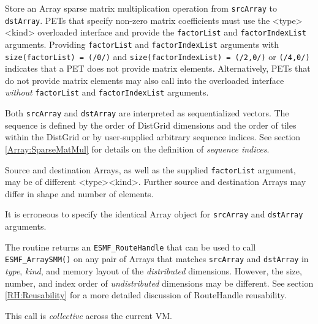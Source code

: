      \begin{sloppypar}
     Store an Array sparse matrix multiplication operation from {\tt srcArray}
     to {\tt dstArray}. PETs that specify non-zero matrix coefficients must use
     the <type><kind> overloaded interface and provide the {\tt factorList} and
     {\tt factorIndexList} arguments. Providing {\tt factorList} and
     {\tt factorIndexList} arguments with {\tt size(factorList) = (/0/)} and
     {\tt size(factorIndexList) = (/2,0/)} or {\tt (/4,0/)} indicates that a 
     PET does not provide matrix elements. Alternatively, PETs that do not 
     provide matrix elements may also call into the overloaded interface
     {\em without} {\tt factorList} and {\tt factorIndexList} arguments.
     \end{sloppypar}
  
     Both {\tt srcArray} and {\tt dstArray} are interpreted as sequentialized
     vectors. The sequence is defined by the order of DistGrid dimensions and 
     the order of tiles within the DistGrid or by user-supplied arbitrary
     sequence indices. See section \ref{Array:SparseMatMul} for details on the
     definition of {\em sequence indices}.
  
     Source and destination Arrays, as well as the supplied {\tt factorList}
     argument, may be of different <type><kind>. Further source and
     destination Arrays may differ in shape and number of elements.
  
     It is erroneous to specify the identical Array object for {\tt srcArray} and
     {\tt dstArray} arguments.
  
     The routine returns an {\tt ESMF\_RouteHandle} that can be used to call 
     {\tt ESMF\_ArraySMM()} on any pair of Arrays that matches 
     {\tt srcArray} and {\tt dstArray} in {\em type}, {\em kind}, and 
     memory layout of the {\em distributed} dimensions. However, the size,
     number, and index order of {\em undistributed} dimensions may be different.
     See section \ref{RH:Reusability} for a more detailed discussion of
     RouteHandle reusability.
  
     This call is {\em collective} across the current VM.
  
